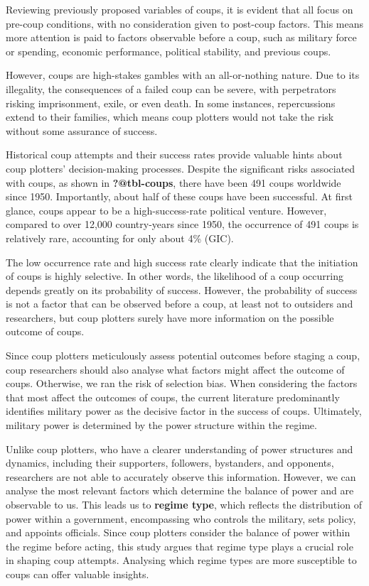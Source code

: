 \documentclass[
  12pt,
]{report}
\begin{document}
Reviewing previously proposed variables of coups, it is evident that all
focus on pre-coup conditions, with no consideration given to post-coup
factors. This means more attention is paid to factors observable before
a coup, such as military force or spending, economic performance,
political stability, and previous coups.

However, coups are high-stakes gambles with an all-or-nothing nature.
Due to its illegality, the consequences of a failed coup can be severe,
with perpetrators risking imprisonment, exile, or even death. In some
instances, repercussions extend to their families, which means coup
plotters would not take the risk without some assurance of success.

Historical coup attempts and their success rates provide valuable hints
about coup plotters' decision-making processes. Despite the significant
risks associated with coups, as shown in \textbf{?@tbl-coups}, there
have been 491 coups worldwide since 1950. Importantly, about half of
these coups have been successful. At first glance, coups appear to be a
high-success-rate political venture. However, compared to over 12,000
country-years since 1950, the occurrence of 491 coups is relatively
rare, accounting for only about 4\% (GIC).

The low occurrence rate and high success rate clearly indicate that the
initiation of coups is highly selective. In other words, the likelihood
of a coup occurring depends greatly on its probability of success.
However, the probability of success is not a factor that can be observed
before a coup, at least not to outsiders and researchers, but coup
plotters surely have more information on the possible outcome of coups.

Since coup plotters meticulously assess potential outcomes before
staging a coup, coup researchers should also analyse what factors might
affect the outcome of coups. Otherwise, we ran the risk of selection
bias. When considering the factors that most affect the outcomes of
coups, the current literature predominantly identifies military power as
the decisive factor in the success of coups. Ultimately, military power
is determined by the power structure within the regime.

Unlike coup plotters, who have a clearer understanding of power
structures and dynamics, including their supporters, followers,
bystanders, and opponents, researchers are not able to accurately
observe this information. However, we can analyse the most relevant
factors which determine the balance of power and are observable to us.
This leads us to \textbf{regime type}, which reflects the distribution
of power within a government, encompassing who controls the military,
sets policy, and appoints officials. Since coup plotters consider the
balance of power within the regime before acting, this study argues that
regime type plays a crucial role in shaping coup attempts. Analysing
which regime types are more susceptible to coups can offer valuable
insights.
\end{document}
